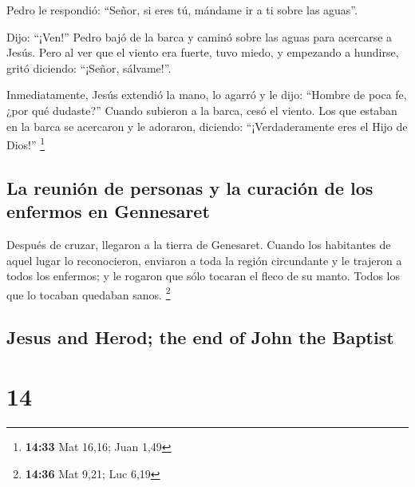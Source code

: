 \begin{paracol}{2}
 Pedro le respondió: ``Señor, si eres tú, mándame ir a ti
sobre las aguas''.

 Dijo: ``¡Ven!'' Pedro bajó de la barca y caminó sobre
las aguas para acercarse a Jesús.  Pero al ver que el
viento era fuerte, tuvo miedo, y empezando a hundirse, gritó diciendo:
``¡Señor, sálvame!''.

 Inmediatamente, Jesús extendió la mano, lo agarró y le
dijo: ``Hombre de poca fe, ¿por qué dudaste?''  Cuando
subieron a la barca, cesó el viento.  Los que estaban en
la barca se acercaron y le adoraron, diciendo: ``¡Verdaderamente eres el
Hijo de Dios!'' \footnote{\textbf{14:33} Mat 16,16; Juan 1,49}

\hypertarget{la-reuniuxf3n-de-personas-y-la-curaciuxf3n-de-los-enfermos-en-gennesaret}{%
\subsection{La reunión de personas y la curación de los enfermos en
Gennesaret}\label{la-reuniuxf3n-de-personas-y-la-curaciuxf3n-de-los-enfermos-en-gennesaret}}

 Después de cruzar, llegaron a la tierra de Genesaret.
 Cuando los habitantes de aquel lugar lo reconocieron,
enviaron a toda la región circundante y le trajeron a todos los
enfermos;  y le rogaron que sólo tocaran el fleco de su
manto. Todos los que lo tocaban quedaban sanos. \footnote{\textbf{14:36}
  Mat 9,21; Luc 6,19}

\switchcolumn
\begin{otherlanguage}{english}

\hypertarget{jesus-and-herod-the-end-of-john-the-baptist}{%
\subsection{Jesus and Herod; the end of John the
Baptist}\label{jesus-and-herod-the-end-of-john-the-baptist}}

\hypertarget{section-27}{%
\section{14}\label{section-27}}


\end{otherlanguage}
\end{paracol}

